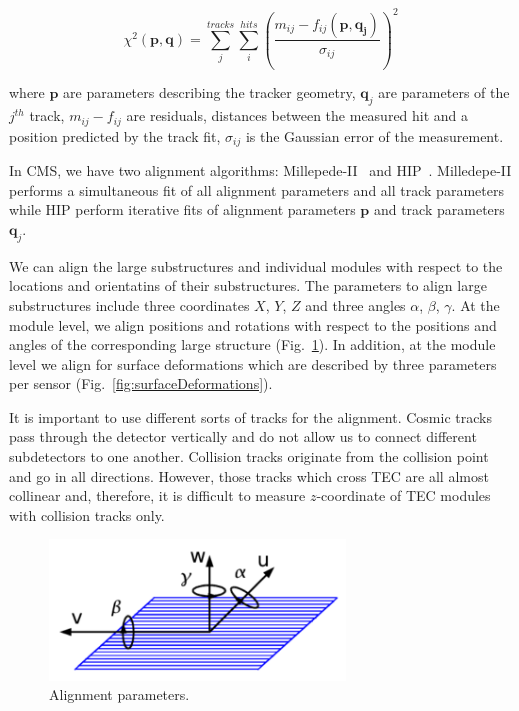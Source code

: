 \begin{equation}
  \chi^2(\mathbf{p},\mathbf{q})=\sum_j^{tracks} \sum_i^{hits} ({\frac{m_{ij}-f_{ij}(\mathbf{p},\mathbf{q_j})}{\sigma_{ij}}})^2
\end{equation}

where $\mathbf{p}$ are parameters describing the tracker geometry, $\mathbf{q}_j$ are parameters of the $j^{th}$ track, $m_{ij}-f_{ij}$ are residuals, distances between the measured hit and a position predicted by the track fit, $\sigma_{ij}$ is the Gaussian error of the measurement.

In CMS, we have two alignment algorithms: Millepede-II~\cite{ref_MPII_Alg} and HIP~\cite{ref_HIP_Alg}. Milledepe-II performs a simultaneous fit of all alignment parameters and all track parameters while HIP perform iterative fits of alignment parameters $\mathbf{p}$ and track parameters $\mathbf{q}_j$.

We can align the large substructures and individual modules with respect to the locations and orientatins of their substructures. The parameters to align large substructures include three coordinates $X$, $Y$, $Z$ and three angles $\alpha$, $\beta$, $\gamma$. At the module level, we align positions and rotations with respect to the positions and angles of the corresponding large structure (Fig.~\ref{fig:alignmentParameters}). In addition, at the module level we align for surface deformations which are described by three parameters per sensor (Fig.~\ref{fig:surfaceDeformations}). 

It is important to use different sorts of tracks for the alignment. Cosmic tracks pass through the detector vertically and do not allow us to connect different subdetectors to one another. Collision tracks originate from the collision point and go in all directions. However, those tracks which cross TEC are all almost collinear and, therefore, it is difficult to measure $z$-coordinate of TEC modules with collision tracks only.

\begin{figure}[htb]
    \begin{center}
        \includegraphics[width=0.70\textwidth]{../figs/Alignment/alignment_strip_coords.png}
    \end{center}
    \caption{Alignment parameters.}
    \label{fig:alignmentParameters}
\end{figure}

